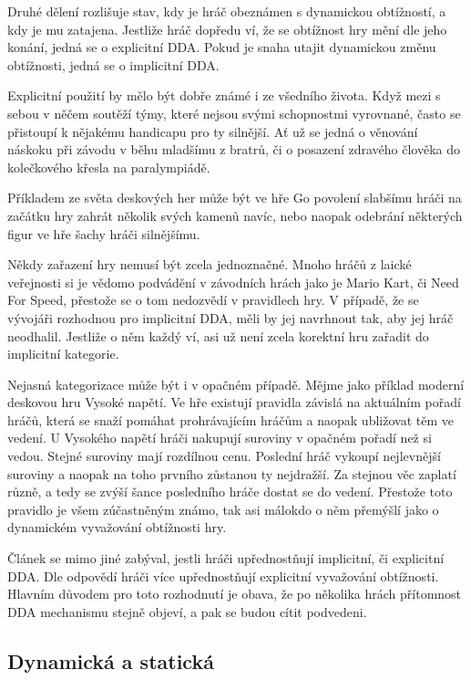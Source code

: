Druhé dělení rozlišuje stav, kdy je hráč obeznámen s dynamickou obtížností, a kdy je mu zatajena. Jestliže hráč dopředu ví, že se obtížnost hry mění dle jeho konání, jedná se o explicitní DDA. Pokud je snaha utajit dynamickou změnu obtížnosti, jedná se o implicitní DDA.

Explicitní použití by mělo být dobře známé i ze všedního života. Když mezi s sebou v něčem soutěží týmy, které nejsou svými schopnostmi vyrovnané, často se přistoupí k nějakému handicapu pro ty silnější. Ať už se jedná o věnování náskoku při závodu v běhu mladšímu z bratrů, či o posazení zdravého člověka do kolečkového křesla na paralympiádě. 

Příkladem ze světa deskových her může být ve hře Go povolení slabšímu hráči na začátku hry zahrát několik svých kamenů navíc, nebo naopak odebrání některých figur ve hře šachy hráči silnějšímu.

Někdy zařazení hry nemusí být zcela jednoznačné. Mnoho hráčů z laické veřejnosti si je vědomo podvádění v závodních hrách jako je Mario Kart\cite{5}, či Need For Speed\cite{1}, přestože se o tom nedozvědí v pravidlech hry. V případě, že se vývojáři rozhodnou pro implicitní DDA, měli by jej navrhnout tak, aby jej hráč neodhalil. Jestliže o něm každý ví, asi už není zcela korektní hru zařadit do implicitní kategorie.

Nejasná kategorizace může být i v opačném případě. Mějme jako příklad moderní deskovou hru Vysoké napětí\cite{powergrid}. Ve hře existují pravidla závislá na aktuálním pořadí hráčů, která se snaží pomáhat prohrávajícím hráčům a naopak ubližovat těm ve vedení. U Vysokého napětí hráči nakupují suroviny v opačném pořadí než si vedou. Stejné suroviny mají rozdílnou cenu. Poslední hráč vykoupí nejlevnější suroviny a naopak na toho prvního zůstanou ty nejdražší. Za stejnou věc zaplatí různě, a tedy se zvýší šance posledního hráče dostat se do vedení. Přestože toto pravidlo je všem zúčastněným známo, tak asi málokdo o něm přemýšlí jako o dynamickém vyvažování obtížnosti hry.

Článek \cite{BoardGames} se mimo jiné zabýval, jestli hráči upřednostňují implicitní, či explicitní DDA. Dle odpovědí hráči více upřednostňují explicitní vyvažování obtížnosti. Hlavním důvodem pro toto rozhodnutí je obava, že po několika hrách přítomnost DDA mechanismu stejně objeví, a pak se budou cítit podvedeni.

\subsection{Dynamická a statická}

